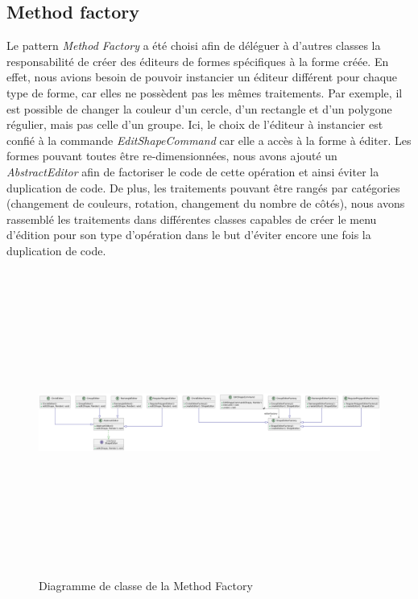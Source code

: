 \documentclass{article}
\begin{document}
\subsection{Method factory}
Le pattern \textit{Method Factory} a été choisi afin de déléguer à d'autres classes la responsabilité de créer des éditeurs de formes
spécifiques à la forme créée. En effet, nous avions besoin de pouvoir instancier un éditeur différent pour chaque type de forme, car elles
ne possèdent pas les mêmes traitements. Par exemple, il est possible de changer la couleur d'un cercle, d'un rectangle et d'un polygone régulier, mais pas celle d'un groupe.
Ici, le choix de l'éditeur à instancier est confié à la commande \textit{EditShapeCommand} car elle a accès à la forme à éditer. Les formes pouvant toutes
être re-dimensionnées, nous avons ajouté un \textit{AbstractEditor} afin de factoriser le code de cette opération et ainsi éviter la duplication de code.
De plus, les traitements pouvant être rangés par catégories (changement de couleurs, rotation, changement du nombre de côtés), nous avons rassemblé les traitements
dans différentes classes capables de créer le menu d'édition pour son type d'opération dans le but d'éviter encore une fois la duplication de code.
\begin{figure}[h]
    \centering
    \includegraphics[width=\textwidth,height=10.0cm,keepaspectratio]{methodFactory.png}
    \caption{Diagramme de classe de la Method Factory}
    \label{MethodFactory}
\end{figure}
\FloatBarrier
\end{document}
